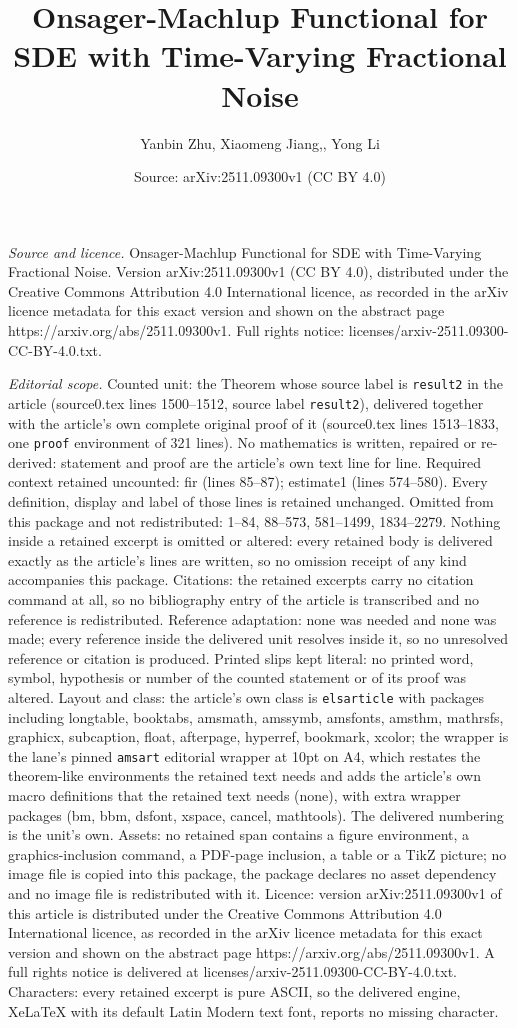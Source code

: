 \documentclass[10pt,a4paper]{amsart}
\title[Onsager-Machlup Functional for SDE with Time-Varying Fractio]{Onsager-Machlup Functional for SDE with Time-Varying Fractional Noise}
\author{Yanbin Zhu, Xiaomeng Jiang,, Yong Li}
\date{Source: arXiv:2511.09300v1 (CC BY 4.0)}
\begin{document}
\maketitle

\noindent\emph{Source and licence.} Onsager-Machlup Functional for SDE with Time-Varying Fractional Noise. Version arXiv:2511.09300v1 (CC BY 4.0), distributed under the Creative Commons Attribution 4.0 International licence, as recorded in the arXiv licence metadata for this exact version and shown on the abstract page https://arxiv.org/abs/2511.09300v1. Full rights notice: licenses/arxiv-2511.09300-CC-BY-4.0.txt.\par\smallskip

\noindent\textit{Editorial scope.} Counted unit: the Theorem whose source label is \texttt{result2} in the article (source0.tex lines 1500--1512, source label \texttt{result2}), delivered together with the article's own complete original proof of it (source0.tex lines 1513--1833, one \texttt{proof} environment of 321 lines). No mathematics is written, repaired or re-derived: statement and proof are the article's own text line for line. Required context retained uncounted: fir (lines 85--87); estimate1 (lines 574--580). Every definition, display and label of those lines is retained unchanged. Omitted from this package and not redistributed: 1--84, 88--573, 581--1499, 1834--2279. Nothing inside a retained excerpt is omitted or altered: every retained body is delivered exactly as the article's lines are written, so no omission receipt of any kind accompanies this package. Citations: the retained excerpts carry no citation command at all, so no bibliography entry of the article is transcribed and no reference is redistributed. Reference adaptation: none was needed and none was made; every reference inside the delivered unit resolves inside it, so no unresolved reference or citation is produced. Printed slips kept literal: no printed word, symbol, hypothesis or number of the counted statement or of its proof was altered. Layout and class: the article's own class is \texttt{elsarticle} with packages including longtable, booktabs, amsmath, amssymb, amsfonts, amsthm, mathrsfs, graphicx, subcaption, float, afterpage, hyperref, bookmark, xcolor; the wrapper is the lane's pinned \texttt{amsart} editorial wrapper at 10pt on A4, which restates the theorem-like environments the retained text needs and adds the article's own macro definitions that the retained text needs (none), with extra wrapper packages (bm, bbm, dsfont, xspace, cancel, mathtools). The delivered numbering is the unit's own. Assets: no retained span contains a figure environment, a graphics-inclusion command, a PDF-page inclusion, a table or a TikZ picture; no image file is copied into this package, the package declares no asset dependency and no image file is redistributed with it. Licence: version arXiv:2511.09300v1 of this article is distributed under the Creative Commons Attribution 4.0 International licence, as recorded in the arXiv licence metadata for this exact version and shown on the abstract page https://arxiv.org/abs/2511.09300v1. A full rights notice is delivered at licenses/arxiv-2511.09300-CC-BY-4.0.txt. Characters: every retained excerpt is pure ASCII, so the delivered engine, XeLaTeX with its default Latin Modern text font, reports no missing character.
\end{document}
